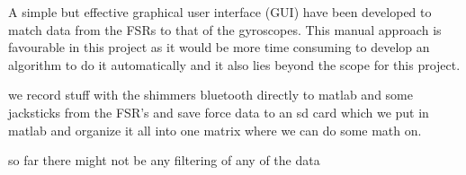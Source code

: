 A simple but effective graphical user interface (GUI) have been developed to match data from the FSRs to that of the gyroscopes. This manual approach is favourable in this project as it would be more time consuming to develop an algorithm to do it automatically and it also lies beyond the scope for this project. 


we record stuff with the shimmers bluetooth directly to matlab and some jacksticks from the FSR's and save force data to an sd card which we put in matlab and organize it all into one matrix where we can do some math on. 

so far there might not be any filtering of any of the data







